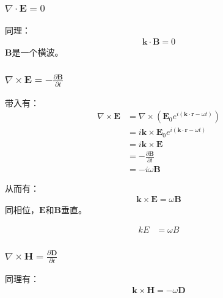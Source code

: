 \documentclass[12pt,onecolumn,a4paper]{book}
\numberwithin{table}{subsection}
\numberwithin{equation}{subsection}
\begin{document}
    \subsubsection{$\nabla \cdot \mathbf{E} = 0$}

    同理：
    \begin{align}
        \mathbf{k} \cdot \mathbf{B} = 0
    \end{align}
$\mathbf{B}$是一个横波。

    \subsubsection{$\nabla \times \mathbf{E} = - \frac{\partial \mathbf{B}}{\partial t}$}

    带入有：
    \begin{align}
        \nabla \times \mathbf{E} & = \nabla \times (\mathbf{E}_0 e^{i ( \mathbf{k} \cdot \mathbf{r}-\omega t )})     \\
                                 & = i \mathbf{k} \times \mathbf{E}_0 e^{i ( \mathbf{k} \cdot \mathbf{r}-\omega t )} \\
                                 & = i \mathbf{k} \times \mathbf{E}                                                  \\
                                 & = - \frac{\partial \mathbf{B}}{\partial t}                                        \\
                                 & = - i \omega \mathbf{B}
    \end{align}

    从而有：
    \begin{align}
        \mathbf{k} \times \mathbf{E} = \omega \mathbf{B}
    \end{align}
    同相位，$\mathbf{E}$和$\mathbf{B}$垂直。

    \begin{align}
        k E & = \omega B
    \end{align}

    \subsubsection{$\nabla \times \mathbf{H} = \frac{\partial \mathbf{D}}{\partial t}$}

    同理有：
    \begin{align}
        \mathbf{k} \times \mathbf{H} = - \omega \mathbf{D}
    \end{align}
\end{document}
